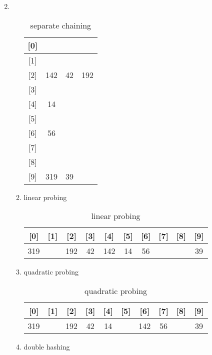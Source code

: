 \documentclass[12pt,a4paper]{article}
\makeatletter
\newtheorem*{solution}{Solution}
\theoremstyle{definition}
\renewenvironment{solution}[1][Solution] {\par\pushQED{\qed}\normalfont\topsep6\p@\@plus6\p@\relax\trivlist\item[\hskip\labelsep\bfseries#1\@addpunct{.}]\ignorespaces}{\popQED\endtrivlist\@endpefalse} \makeatother
\makeatother
\begin{document}
\begin{enumerate}
\begin{solution}
\begin{enumerate}
\begin{table}[h]
				\label{separate chaining}
				\begin{tabular}{|c|ccc|}
					\hline
					{[}0{]} &     &    &     \\ \hline
					{[}1{]} &     &    &     \\ \hline
					{[}2{]} & 142 & 42 & 192 \\ \hline
					{[}3{]} &     &    &     \\ \hline
					{[}4{]} & 14  &    &     \\ \hline
					{[}5{]} &     &    &     \\ \hline
					{[}6{]} & 56  &    &     \\ \hline
					{[}7{]} &     &    &     \\ \hline
					{[}8{]} &     &    &     \\ \hline
					{[}9{]} & 319 & 39 &    
				\end{tabular}
				\caption{separate chaining}
			\end{table}
		\item linear probing
			\begin{table}[h]
			\centering
			\begin{tabular}{|c|c|c|c|c|c|c|c|c|c|}
			\hline
			{[}0{]} & {[}1{]} & {[}2{]} & {[}3{]} & {[}4{]} & {[}5{]} & {[}6{]} & {[}7{]} & {[}8{]} & {[}9{]} \\ \hline
			319     &         & 192     & 42      & 142     & 14      & 56      &         &         & 39      \\ \hline
			\end{tabular}
			\caption{linear probing}
			\label{lb}
			\end{table}
		\item quadratic probing
			\begin{table}[h]
			\centering
			\begin{tabular}{|c|c|c|c|c|c|c|c|c|c|}
			\hline
			{[}0{]} & {[}1{]} & {[}2{]} & {[}3{]} & {[}4{]} & {[}5{]} & {[}6{]} & {[}7{]} & {[}8{]} & {[}9{]} \\ \hline
			319     &         & 192     & 42      & 14      &         & 142     & 56      &         & 39      \\ \hline
			\end{tabular}
			\caption{quadratic probing}
			\label{pb}
			\end{table}
			\newpage
		\item double hashing
			\begin{table}[h]
			\centering
			\begin{tabular}{|c|c|c|c|c|c|c|c|c|c|}

\end{tabular}
\end{table}
\end{enumerate}
\end{solution}
\end{enumerate}
\end{document}
